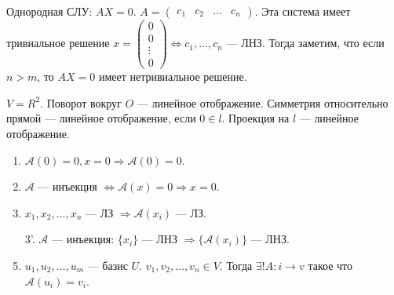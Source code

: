 Однородная СЛУ: $AX = 0$.  $A = \begin{pmatrix} c_1 & c_2 & \ldots & c_n \end{pmatrix}$. Эта система имеет тривиальное решение $x = \begin{pmatrix} 0 \\ 0 \\ \vdots \\ 0\end{pmatrix} \iff c_1, \ldots, c_n$ --- ЛНЗ. Тогда заметим, что если $n > m$, то  $AX=0$ имеет нетривиальное решение.
\begin{example}
   $V=R^2$. Поворот вокруг $O$ --- линейное отображение. Симметрия относительно прямой --- линейное отображение, если  $0 \in l$. Проекция на  $l$ --- линейное отображение.
\end{example}
\begin{properties}
    \begin{enumerate}
        \item $\mathcal{A}(0) = 0, x = 0 \Rightarrow \mathcal{A}(0) = 0$.
        \item $\mathcal{A}$ --- инъекция  $\iff \mathcal{A}(x) = 0 \Rightarrow x = 0$.
        \item $x_1, x_2, \ldots, x_n$ --- ЛЗ $\Rightarrow \mathcal{A}(x_i)$ --- ЛЗ.
        \item[3'.] $\mathcal{A}$ --- инъекция:  $\{x_i \}$ --- ЛНЗ  $\Rightarrow \{\mathcal{A}(x_i)\}$ --- ЛНЗ.
        \item  $u_1, u_2, \ldots, u_m$ --- базис $U$.  $v_1, v_2, \ldots, v_n \in V$. Тогда $\exists! A\!: i \to v$ такое что  $\mathcal{A}(u_i) = v_i$.
    \end{enumerate}
\end{properties}
